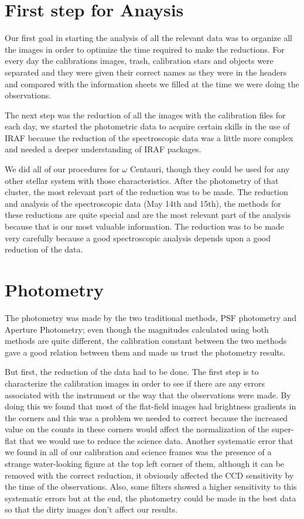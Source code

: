 \section{First step for Anaysis}

Our first goal in starting the analysis of all the relevant data was to organize all the images in order to optimize the time required to make the reductions. For every day the calibrations images, trash, calibration stars and objects were separated and they were given their correct names as they were in the headers and compared with the information sheets we filled at the time we were doing the observations.

The next step was the reduction of all the images with the calibration files for each day, we started the photometric data to acquire certain skills in the use of IRAF because the reduction of the spectroscopic data was a little more complex and needed a deeper understanding of IRAF packages. 

We did all of our procedures for $\omega$ Centauri, though they could be used for any other stellar system with those characteristics. After the photometry of that cluster, the most relevant part of the reduction was to be made. The reduction and analysis of the spectroscopic data (May 14th and 15th), the methods for these reductions are quite special and are the most relevant part of the analysis because that is our most valuable information. The reduction was to be made very carefully because a good spectroscopic analysis depends upon a good reduction of the data.

\section{Photometry}

The photometry was made by the two traditional methods, PSF photometry and Aperture Photometry; even though the magnitudes calculated using both methods are quite different, the calibration constant between the two methods gave a good relation between them and made us trust the photometry results.

But first, the reduction of the data had to be done. The first step is to characterize the calibration images in order to see if there are any errors associated with the instrument or the way that the observations were made. By doing this we found that most of the flat-field images had brightness gradients in the corners and this was a problem we needed to correct because the increased value on the counts in these corners would affect the normalization of the super-flat that we would use to reduce the science data. Another systematic error that we found in all of our calibration and science frames was the presence of a strange water-looking figure at the top left corner of them, although it can be removed with the correct reduction, it obviously affected the CCD sensitivity by the time of the observations. Also, some filters showed a higher sensitivity to this systematic errors but at the end, the photometry could be made in the best data so that the dirty images don't affect our results.

